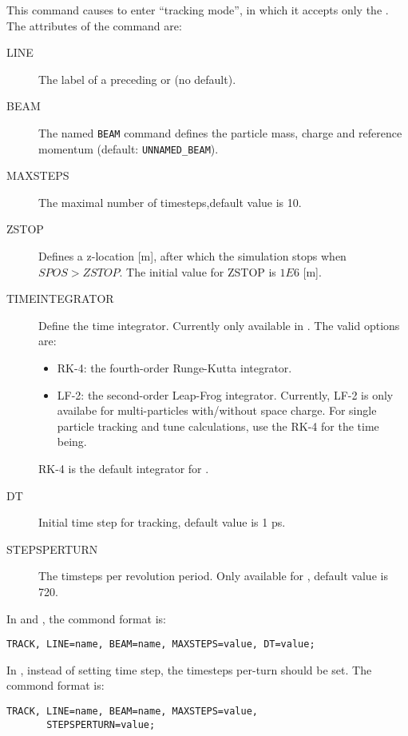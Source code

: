 This command causes \opal to enter ``tracking mode'',
in which it accepts only the .
The attributes of the command are:
\begin{description}
\item[LINE]
  The label of a preceding  or
   (no default).
\item[BEAM]
  The named \texttt{BEAM} command defines the particle mass, charge
  and reference momentum (default: \texttt{UNNAMED\_BEAM}).
\item[MAXSTEPS]
  The maximal number of timesteps,default value is 10.
 \item[ZSTOP]
  Defines a z-location [m], after which the simulation stops when $SPOS > ZSTOP$. The initial 
  value for ZSTOP is $1E6$ [m].

 \item[TIMEINTEGRATOR]
  Define the time integrator. Currently only available in \opalcycl. 
  The valid options are:
  \begin{itemize}
    \item RK-4: the fourth-order Runge-Kutta integrator.
    \item LF-2: the second-order Leap-Frog integrator. 
      Currently, LF-2 is only availabe for multi-particles with/without space charge.
      For single particle tracking and tune calculations, use the RK-4 for the time being.
  \end{itemize}
  RK-4 is the default integrator for \opalcycl.
\item[DT]
  Initial time step for tracking, default value is 1 ps.
\item[STEPSPERTURN]
  The timsteps per revolution period. Only available for \opalcycl, default value is 720.
  
\end{description}

In \opalt and \opalmap, the commond format is:
\begin{verbatim}
TRACK, LINE=name, BEAM=name, MAXSTEPS=value, DT=value;
\end{verbatim}

In \opalcycl, instead of setting time step, the timesteps per-turn should be set. 
The commond format is:  
\begin{verbatim}
TRACK, LINE=name, BEAM=name, MAXSTEPS=value, 
       STEPSPERTURN=value;
\end{verbatim}

